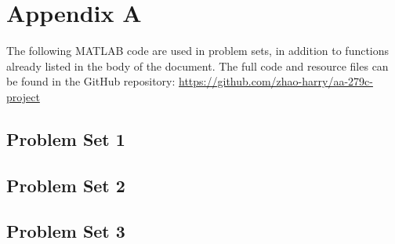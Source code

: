 \appendix

\section{Appendix A}
The following MATLAB code are used in problem sets, in addition to functions already listed in the body of the document. The full code and resource files can be found in the GitHub repository: \url{https://github.com/zhao-harry/aa-279c-project}

\subsection{Problem Set 1}


\subsection{Problem Set 2}







\subsection{Problem Set 3}

